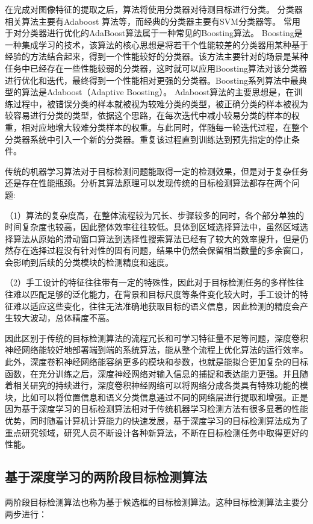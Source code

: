 在完成对图像特征的提取之后，算法将使用分类器对待测目标进行分类。
分类器相关算法主要有Adaboost\cite{freund1997decision} 算法等，而经典的分类器主要有SVM\cite{cortes1995support}分类器等。
常用于对分类器进行优化的AdaBoost算法属于一种常见的Boosting算法。
Boosting是一种集成学习的技术，该算法的核心思想是将若干个性能较差的分类器用某种基于经验的方法结合起来，得到一个性能较好的分类器。该方法主要针对的场景是某种任务中已经存在一些性能较弱的分类器，这时就可以应用Boosting算法对该分类器进行优化和迭代，最终得到一个性能相对更强的分类器。Boosting系列算法中最典型的算法是Adaboost（Adaptive Boosting）。
Adaboost算法的主要思想是，在训练过程中，被错误分类的样本就被视为较难分类的类型，被正确分类的样本被视为较容易进行分类的类型，依据这个思路，在每次迭代中减小较易分类的样本的权重，相对应地增大较难分类样本的权重。与此同时，伴随每一轮迭代过程，在整个分类器系统中引入一个新的分类器。重复该过程直到训练达到预先指定的停止条件。

传统的机器学习算法对于目标检测问题能取得一定的检测效果，但是对于复杂任务还是存在性能瓶颈。分析其算法原理可以发现传统的目标检测算法都存在两个问题:

（1）算法的复杂度高，在整体流程较为冗长、步骤较多的同时，各个部分单独的时间复杂度也较高，因此整体效率往往较低。具体到区域选择算法中，虽然区域选择算法从原始的滑动窗口算法到选择性搜索算法已经有了较大的效率提升，但是仍然存在选择过程没有针对性的固有问题，结果中仍然会保留相当数量的多余窗口，会影响到后续的分类模块的检测精度和速度。

（2）手工设计的特征往往带有一定的特殊性，因此对于目标检测任务的多样性往往难以匹配足够的泛化能力，在背景和目标尺度等条件变化较大时，手工设计的特征难以适应这些变化，往往无法准确地获取目标的语义信息，因此检测的精度会产生较大波动，总体精度不高。

因此区别于传统的目标检测算法的流程冗长和可学习特征量不足等问题，深度卷积神经网络能较好地部署端到端的系统算法，能从整个流程上优化算法的运行效率。此外，深度卷积神经网络能容纳更多的模块和参数，也就是能拟合更加复杂的目标函数，在充分训练之后，深度神经网络对输入信息的捕捉和表达能力更强。并且随着相关研究的持续进行，深度卷积神经网络可以将网络分成各类具有特殊功能的模块，比如可以将位置信息和语义分类信息通过不同的网络层进行提取和增强。正是因为基于深度学习的目标检测算法相对于传统机器学习检测方法有很多显著的性能优势，同时随着计算机计算能力的快速发展，基于深度学习的目标检测算法成为了重点研究领域，研究人员不断设计各种新算法，不断在目标检测任务中取得更好的性能。

\subsection{基于深度学习的两阶段目标检测算法}
两阶段目标检测算法也称为基于候选框的目标检测算法。这种目标检测算法主要分两步进行：

